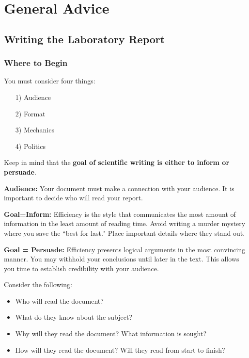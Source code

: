 \chapter{General Advice}



\section{Writing the Laboratory Report}

\subsection{Where to Begin}

You must consider four things:
\begin{itemize}
    \item[1)] Audience 
    \item[2)] Format
    \item[3)] Mechanics
    \item[4)] Politics
\end{itemize}

Keep in mind that the \textbf{goal of scientific writing is either to inform or persuade}.


\textbf{Audience:} Your document must make a connection with your audience. It is important to decide who will read your report.


\textbf{Goal=Inform:} Efficiency is the style that communicates the most amount of information in the least amount of reading time. Avoid writing a murder mystery where you save the ``best for last." Place important details where they stand out.


\textbf{Goal = Persuade:} Efficiency presents logical arguments in the most convincing manner. You may withhold your conclusions until later in the text. This allows you time to establish credibility with your audience.

Consider the following:
\begin{itemize}
    \item Who will read the document?
    \item What do they know about the subject?
    \item Why will they read the document? What information is sought?
    \item How will they read the document? Will they read from start to finish?
\end{itemize}


